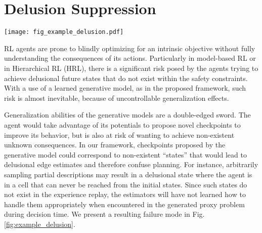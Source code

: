 \section{Delusion Suppression}

\begin{SCfigure}%
\centering
\vspace*{-3mm}
\texttt{[image: fig\_example\_delusion.pdf]}
\caption{\small \textbf{Example of Failure Caused by Delusions}: we illustrate an instance of chasing delusional checkpoint in one of our experimental runs by \agentshort{}. The distance (discount) estimator, probably due to the ill-generalization, estimates that the delusional checkpoint (yellow) is \underline{very close to every other state}. A resulting plan was that the agent thought it could reach any far-away checkpoints by using the delusional state to form a shortcut: the goal that was at least $17$ steps away would be reached in $2.2$.}
\label{fig:example_delusion}
\end{SCfigure}


RL agents are prone to blindly optimizing for an intrinsic objective without fully understanding the consequences of its actions. Particularly in model-based RL or in Hierarchical RL (HRL), there is a significant risk posed by the agents trying to achieve delusional future states that do not exist within the safety constraints. With a use of a learned generative model, as in the proposed framework, such risk is almost inevitable, because of uncontrollable generalization effects. 

Generalization abilities of the generative models are a double-edged sword. The agent would take advantage of its potentials to propose novel checkpoints to improve its behavior, but is also at risk of wanting to achieve non-existent unknown consequences. In our framework, checkpoints proposed by the generative model could correspond to non-existent ``states'' that would lead to delusional edge estimates and therefore confuse planning. For instance, arbitrarily sampling partial descriptions may result in a delusional state where the agent is in a cell that can never be reached from the initial states. Since such states do not exist in the experience replay, the estimators will have not learned how to handle them appropriately when encountered in the generated proxy problem during decision time. We present a resulting failure mode in Fig. \ref{fig:example_delusion}.

